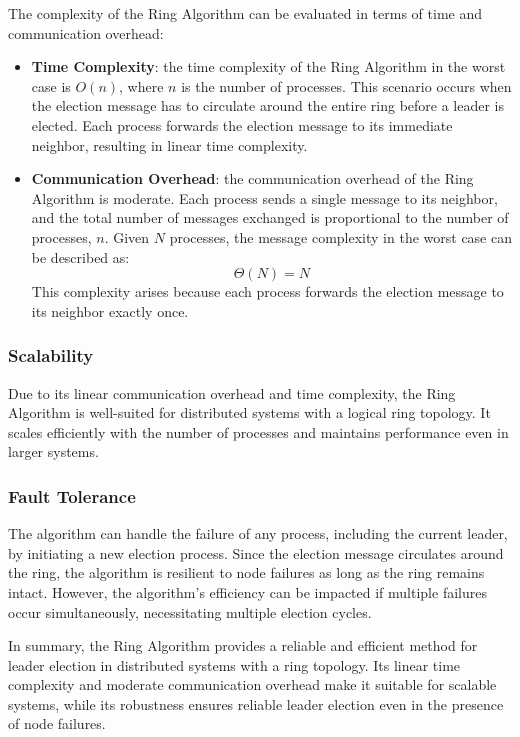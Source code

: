 The complexity of the Ring Algorithm can be evaluated in terms of time and communication overhead:
\begin{itemize}
    \item \textbf{Time Complexity}: the time complexity of the Ring Algorithm in the worst case is \(O(n)\), where \(n\) is the number of processes. This scenario occurs when the election message has to circulate around the entire ring before a leader is elected. Each process forwards the election message to its immediate neighbor, resulting in linear time complexity.
    \item \textbf{Communication Overhead}: the communication overhead of the Ring Algorithm is moderate. Each process sends a single message to its neighbor, and the total number of messages exchanged is proportional to the number of processes, \(n\). Given \(N\) processes, the message complexity in the worst case can be described as:
\[
\Theta(N) = N
\]
This complexity arises because each process forwards the election message to its neighbor exactly once.
\end{itemize}

\subsubsection{Scalability}

Due to its linear communication overhead and time complexity, the Ring Algorithm is well-suited for distributed systems with a logical ring topology. It scales efficiently with the number of processes and maintains performance even in larger systems.

\subsubsection{Fault Tolerance}

The algorithm can handle the failure of any process, including the current leader, by initiating a new election process. Since the election message circulates around the ring, the algorithm is resilient to node failures as long as the ring remains intact. However, the algorithm's efficiency can be impacted if multiple failures occur simultaneously, necessitating multiple election cycles.

In summary, the Ring Algorithm provides a reliable and efficient method for leader election in distributed systems with a ring topology. Its linear time complexity and moderate communication overhead make it suitable for scalable systems, while its robustness ensures reliable leader election even in the presence of node failures.

